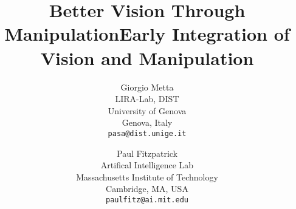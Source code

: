 \documentclass[]{article}
\begin{document}
 



\onecolumn


\ifrev
\title{Better Vision Through Manipulation}
\else
\title{Early Integration of Vision and Manipulation}
\fi

\author{
Giorgio Metta\\
LIRA-Lab, DIST\\
University of Genova\\
Genova, Italy\\
{\tt pasa@dist.unige.it}
\and 
Paul Fitzpatrick\\
Artifical Intelligence Lab\\
Massachusetts Institute of Technology\\
Cambridge, MA, USA\\
{\tt paulfitz@ai.mit.edu}
}





\maketitle

\ifdraft
  \thispagestyle{plain}
  \pagestyle{plain}
\fi

\pagestyle{fancy}
\end{document}
